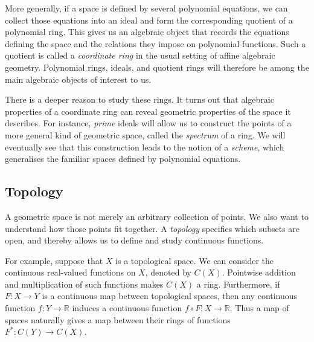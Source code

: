 \documentclass[a4paper,11pt]{article}
\begin{document}
    More generally, if a space is defined by several polynomial equations, we can collect those equations into an ideal and form the corresponding quotient of a polynomial ring. This gives us an algebraic object that records the equations defining the space and the relations they impose on polynomial functions. Such a quotient is called a \textit{coordinate ring} in the usual setting of affine algebraic geometry. Polynomial rings, ideals, and quotient rings will therefore be among the main algebraic objects of interest to us.

    There is a deeper reason to study these rings. It turns out that algebraic properties of a coordinate ring can reveal geometric properties of the space it describes. For instance, \textit{prime} ideals will allow us to construct the points of a more general kind of geometric space, called the \textit{spectrum} of a ring. We will eventually see that this construction leads to the notion of a \textit{scheme}, which generalises the familiar spaces defined by polynomial equations.

    \subsection{Topology}
    A geometric space is not merely an arbitrary collection of points. We also want to understand how those points fit together. A \textit{topology} specifies which subsets are open, and thereby allows us to define and study continuous functions. 

    For example, suppose that \(X\) is a topological space. We can consider the continuous real-valued functions on \(X\), denoted by \(C(X)\). Pointwise addition and multiplication of such functions makes \(C(X)\) a ring. Furthermore, if \(F: X \to Y\) is a continuous map between topological spaces, then any continuous function \(f: Y \to \mathbb{R}\) induces a continuous function \(f \circ F: X \to \mathbb{R}\). Thus a map of spaces naturally gives a map between their rings of functions \(F^*: C(Y) \to C(X)\).
\end{document}
